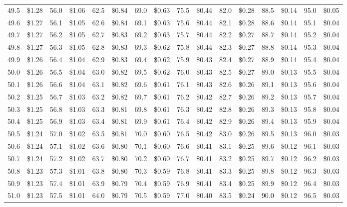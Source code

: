 \documentclass{article}
\begin{document}
\begin{tabular}{|*{8}{rr|}}
49.5 & \$1.28 & 56.0 & \$1.06 & 62.5 & \$0.84 & 69.0 & \$0.63 & 75.5 & \$0.44 & 82.0 & \$0.28 & 88.5 & \$0.14 & 95.0 & \$0.05\\
49.6 & \$1.27 & 56.1 & \$1.05 & 62.6 & \$0.84 & 69.1 & \$0.63 & 75.6 & \$0.44 & 82.1 & \$0.28 & 88.6 & \$0.14 & 95.1 & \$0.04\\
49.7 & \$1.27 & 56.2 & \$1.05 & 62.7 & \$0.83 & 69.2 & \$0.63 & 75.7 & \$0.44 & 82.2 & \$0.27 & 88.7 & \$0.14 & 95.2 & \$0.04\\
49.8 & \$1.27 & 56.3 & \$1.05 & 62.8 & \$0.83 & 69.3 & \$0.62 & 75.8 & \$0.44 & 82.3 & \$0.27 & 88.8 & \$0.14 & 95.3 & \$0.04\\
49.9 & \$1.26 & 56.4 & \$1.04 & 62.9 & \$0.83 & 69.4 & \$0.62 & 75.9 & \$0.43 & 82.4 & \$0.27 & 88.9 & \$0.14 & 95.4 & \$0.04\\
50.0 & \$1.26 & 56.5 & \$1.04 & 63.0 & \$0.82 & 69.5 & \$0.62 & 76.0 & \$0.43 & 82.5 & \$0.27 & 89.0 & \$0.13 & 95.5 & \$0.04\\
50.1 & \$1.26 & 56.6 & \$1.04 & 63.1 & \$0.82 & 69.6 & \$0.61 & 76.1 & \$0.43 & 82.6 & \$0.26 & 89.1 & \$0.13 & 95.6 & \$0.04\\
50.2 & \$1.25 & 56.7 & \$1.03 & 63.2 & \$0.82 & 69.7 & \$0.61 & 76.2 & \$0.42 & 82.7 & \$0.26 & 89.2 & \$0.13 & 95.7 & \$0.04\\
50.3 & \$1.25 & 56.8 & \$1.03 & 63.3 & \$0.81 & 69.8 & \$0.61 & 76.3 & \$0.42 & 82.8 & \$0.26 & 89.3 & \$0.13 & 95.8 & \$0.04\\
50.4 & \$1.25 & 56.9 & \$1.03 & 63.4 & \$0.81 & 69.9 & \$0.61 & 76.4 & \$0.42 & 82.9 & \$0.26 & 89.4 & \$0.13 & 95.9 & \$0.04\\
50.5 & \$1.24 & 57.0 & \$1.02 & 63.5 & \$0.81 & 70.0 & \$0.60 & 76.5 & \$0.42 & 83.0 & \$0.26 & 89.5 & \$0.13 & 96.0 & \$0.03\\
50.6 & \$1.24 & 57.1 & \$1.02 & 63.6 & \$0.80 & 70.1 & \$0.60 & 76.6 & \$0.41 & 83.1 & \$0.25 & 89.6 & \$0.12 & 96.1 & \$0.03\\
50.7 & \$1.24 & 57.2 & \$1.02 & 63.7 & \$0.80 & 70.2 & \$0.60 & 76.7 & \$0.41 & 83.2 & \$0.25 & 89.7 & \$0.12 & 96.2 & \$0.03\\
50.8 & \$1.23 & 57.3 & \$1.01 & 63.8 & \$0.80 & 70.3 & \$0.59 & 76.8 & \$0.41 & 83.3 & \$0.25 & 89.8 & \$0.12 & 96.3 & \$0.03\\
50.9 & \$1.23 & 57.4 & \$1.01 & 63.9 & \$0.79 & 70.4 & \$0.59 & 76.9 & \$0.41 & 83.4 & \$0.25 & 89.9 & \$0.12 & 96.4 & \$0.03\\
51.0 & \$1.23 & 57.5 & \$1.01 & 64.0 & \$0.79 & 70.5 & \$0.59 & 77.0 & \$0.40 & 83.5 & \$0.24 & 90.0 & \$0.12 & 96.5 & \$0.03\\

\end{tabular}
\end{document}
